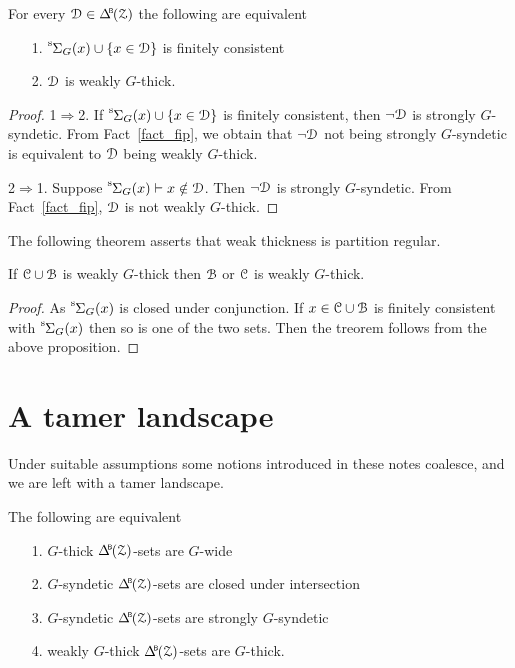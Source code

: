 \begin{proposition}\label{prop_q_w_pers}
  For every $\D\in\BDelta(\Z)$ the following are equivalent
  \begin{itemize}
    \item [1.] ${\mathstrut}^{\rm s}\kern-.1ex\Sigma_G(x)\cup\{x\in\EuScript D\}$ is finitely consistent
    \item [2.] $\EuScript D$ is weakly $G$-thick.
  \end{itemize}
\end{proposition}

\begin{proof}
  1$\Rightarrow$2. 
  If ${\mathstrut}^{\rm s}\kern-.1ex\Sigma_G(x)\cup\{x\in\EuScript D\}$ is finitely consistent, then $\neg\EuScript D$ is strongly $G$-syndetic.
  From Fact~\ref{fact_fip}, we obtain that $\neg\EuScript D$ not being strongly $G$-syndetic is equivalent to $\EuScript D$ being weakly $G$-thick.

  2$\Rightarrow$1.
  Suppose ${\mathstrut}^{\rm s}\kern-.1ex\Sigma_G(x)\vdash x\notin\EuScript D$.
  Then $\neg\EuScript D$ is strongly $G$-syndetic.
  From Fact~\ref{fact_fip}, $\EuScript D$ is not weakly $G$-thick.
\end{proof}

The following theorem asserts that weak thickness is partition regular.

\begin{theorem}\label{thm_wt_partreg}
  If $\EuScript C\cup\EuScript B$ is weakly $G$-thick then $\EuScript B$ or $\EuScript C$ is weakly $G$-thick.
\end{theorem}

\begin{proof}
  As ${\mathstrut}^{\rm s}\kern-.1ex\Sigma_G(x)$ is closed under conjunction.
  If $x\in \EuScript C\cup\EuScript B$ is finitely consistent with ${\mathstrut}^{\rm s}\kern-.1ex\Sigma_G(x)$ then so is one of the two sets.
  Then the treorem follows from the above proposition.
\end{proof}

\section{A tamer landscape}\label{tame_landscape}

Under suitable assumptions some notions introduced in these notes coalesce, and we are left with a tamer landscape.

\begin{theorem}\label{thm_coalesce}
  The following are equivalent
  \begin{itemize}
    \item[1.] $G$-thick $\BDelta({\Z})$-sets are $G$-wide
    \item[2.] $G$-syndetic $\BDelta({\Z})$-sets are closed under intersection 
    \item[3.] $G$-syndetic $\BDelta({\Z})$-sets are strongly $G$-syndetic
    \item[4.] weakly $G$-thick $\BDelta({\Z})$-sets are $G$-thick.
  \end{itemize}
\end{theorem}

